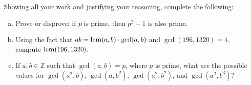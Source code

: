 \documentclass[11pt,letterpaper]{article}
\begin{document}
\newpage



 Showing all your work and justifying your reasoning, complete the following:
	\begin{enumerate}[(a)]
	\item Prove or disprove: if $p$ is prime, then $p^2 + 1$ is also prime. 
	\item Using the fact that $ab= \operatorname{lcm}(a, b) \cdot \gcd(a, b)$ and $\gcd(196, 1320)= 4$, compute $\operatorname{lcm}(196, 1320)$. 
	\item If $a, b \in \mathbb{Z}$ such that $\gcd(a, b)= p$, where $p$ is prime, what are the possible values for $\gcd(a^2, b)$, $\gcd(a, b^2)$, $\gcd(a^2, b^2)$, and $\gcd(a^2, b^3)$? 
	\end{enumerate}
\end{document}
